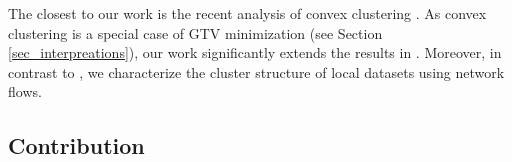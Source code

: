 \documentclass[lettersize,journal]{IEEEtran}
\begin{document}
The closest to our work is the recent analysis of convex clustering \cite{JMLR:v22:18-694}. As convex 
clustering is a special case of GTV minimization (see Section \ref{sec_interpreations}), our work 
significantly extends the results in \cite{JMLR:v22:18-694}. Moreover, in contrast to \cite{JMLR:v22:18-694}, 
we characterize the cluster structure of local datasets using network flows.  







\subsection{Contribution} 
\end{document}
